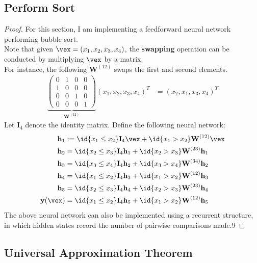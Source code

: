 \documentclass{article}
\begin{document}
	\subsection{Perform Sort}
	\begin{proof}
		For this section, I am implementing a feedforward neural network performing bubble sort. \\
		Note that given $\vex = (x_1, x_2, x_3, x_4)$, the \textbf{swapping} operation can be conducted by multiplying $\vex$ by a matrix. \\
		For instance, the following $\textbf{W}^{(12)}$ swaps the first and second elements.
		\begin{align}
			\underbrace{\begin{pmatrix}
				0 & 1 & 0 & 0 \\
				1 & 0 & 0 & 0 \\
				0 & 0 & 1 & 0 \\
				0 & 0 & 0 & 1
			\end{pmatrix}}_{\textbf{W}^{(12)}} (x_1, x_2, x_3, x_4)^T
			&= (x_2, x_1, x_3, x_4)^T
		\end{align}
		Let $\textbf{I}_4$ denote the identity matrix. Define the following neural network:
		\begin{align}
			\textbf{h}_1 &:= \id{x_1 \leq x_2} \textbf{I}_4 \vex
			+ \id{x_1 > x_2} \textbf{W}^{(12)} \vex \\
			\textbf{h}_2 &= \id{x_2 \leq x_3} \textbf{I}_4 \textbf{h}_1
			+ \id{x_2 > x_3} \textbf{W}^{(23)} \textbf{h}_1 \\
			\textbf{h}_3 &= \id{x_3 \leq x_4} \textbf{I}_4 \textbf{h}_2
			+ \id{x_3 > x_4} \textbf{W}^{(34)} \textbf{h}_2 \\
			\textbf{h}_4 &= \id{x_1 \leq x_2} \textbf{I}_4 \textbf{h}_3
			+ \id{x_1 > x_2} \textbf{W}^{(12)} \textbf{h}_3 \\
			\textbf{h}_5 &= \id{x_2 \leq x_3} \textbf{I}_4 \textbf{h}_4
			+ \id{x_2 > x_3} \textbf{W}^{(23)} \textbf{h}_4 \\
			\textbf{y}(\vex) &= \id{x_1 \leq x_2} \textbf{I}_4 \textbf{h}_5
			+ \id{x_1 > x_2} \textbf{W}^{(12)} \textbf{h}_5
		\end{align}
		The above neural network can also be implemented using a recurrent structure, in which hidden states record the number of pairwise comparisons made.9
	\end{proof}
	
	\subsection{Universal Approximation Theorem}
\end{document}
